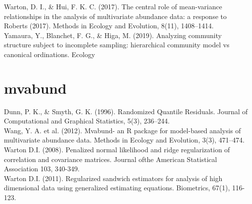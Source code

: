 \documentclass{article}
\begin{document}
Warton, D. I., \& Hui, F. K. C. (2017). The central role of mean-variance relationships in the analysis of multivariate abundance data: a response to Roberts (2017). Methods in Ecology and Evolution, 8(11), 1408–1414. \\

Yamaura, Y., Blanchet, F. G., \& Higa, M. (2019). Analyzing community structure subject to incomplete sampling: hierarchical community model vs canonical ordinations. Ecology\\
\section{mvabund}
Dunn, P. K., \& Smyth, G. K. (1996). Randomized Quantile Residuals. Journal of Computational and Graphical Statistics, 5(3), 236–244. \\

Wang, Y. A. et al. (2012). Mvabund- an R package for model-based analysis of multivariate abundance data. Methods in Ecology and Evolution, 3(3), 471–474. \\

Warton D.I. (2008). Penalized normal likelihood and ridge regularization of correlation and covariance matrices. Journal ofthe American Statistical Association 103, 340-349.\\ 

Warton D.I. (2011). Regularized sandwich estimators for analysis of high dimensional data using generalized estimating equations. Biometrics, 67(1), 116-123.\\
\end{document}
